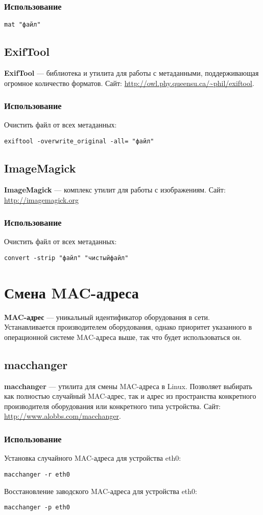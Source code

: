 \subsubsection{Использование}
\begin{lstlisting}
mat "файл"
\end{lstlisting}
\subsection{ExifTool}
\textbf{ExifTool} --- библиотека и утилита для работы с метаданными, поддерживающая огромное количество форматов. Сайт: \url{http://owl.phy.queensu.ca/~phil/exiftool}.
\subsubsection{Использование}
Очистить файл от всех метаданных:
\begin{lstlisting}
exiftool -overwrite_original -all= "файл"
\end{lstlisting}
\subsection{ImageMagick}
\textbf{ImageMagick} --- комплекс утилит для работы с изображениям. Сайт: \url{http://imagemagick.org}
\subsubsection{Использование}
Очистить файл от всех метаданных:
\begin{lstlisting}
convert -strip "файл" "чистыйфайл"
\end{lstlisting}
\section{Смена MAC-адреса}
\textbf{MAC-адрес} --- уникальный идентификатор оборудования в сети. Устанавливается производителем оборудования, однако приоритет указанного в операционной системе MAC-адреса выше, так что будет использоваться он.
\subsection{macchanger}
\textbf{macchanger} --- утилита для смены MAC-адреса в Linux. Позволяет выбирать как полностью случайный MAC-адрес, так и адрес из пространства конкретного производителя оборудования или конкретного типа устройства. Сайт: \url{http://www.alobbs.com/macchanger}.
\subsubsection{Использование}
Установка случайного MAC-адреса для устройства eth0:
\begin{lstlisting}
macchanger -r eth0
\end{lstlisting}
Восстановление заводского MAC-адреса для устройства eth0:
\begin{lstlisting}
macchanger -p eth0
\end{lstlisting}
